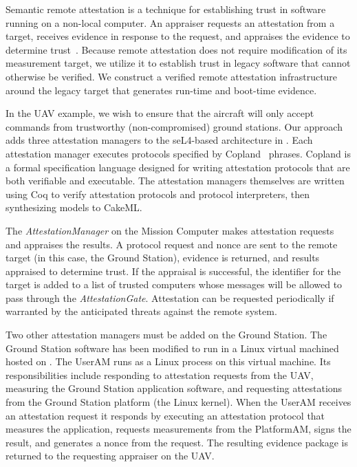 Semantic remote attestation is a technique for  establishing
trust in software running on a non-local computer.  
An appraiser requests an attestation from
a target, receives evidence in response to the request, and appraises
the evidence to determine
trust~\cite{Coker::Principles-of-R}. Because
remote attestation does not require modification of its measurement
target, we utilize it to establish trust in legacy software
that cannot otherwise be verified.  We construct a verified remote
attestation infrastructure around the legacy target that generates
run-time and boot-time evidence.

In the UAV example, we wish to ensure that the aircraft will only
accept commands from trustworthy (non-compromised) ground stations.
Our approach adds three attestation managers to the seL4-based
architecture in .  Each attestation manager
executes protocols specified by Copland~\cite{Ramsdell:2019aa}
phrases.  Copland is a formal specification language designed for
writing attestation protocols that are both verifiable and executable.
The attestation managers themselves are written using Coq to verify
attestation protocols and protocol interpreters, then synthesizing
models to CakeML.

The \emph{AttestationManager} on the Mission Computer makes
attestation requests and appraises the results.  A protocol request and nonce are
sent to the remote target (in this case, the Ground Station), 
evidence is returned, and results appraised to
determine trust.  If the appraisal is successful, the identifier for the 
target is added to a list of trusted computers whose messages 
will be allowed to pass through the \emph{AttestationGate}.  
Attestation can be requested periodically if warranted by the anticipated
threats against the remote system.  

Two other attestation managers must be added on the Ground Station.  
The Ground Station software has been modified to run in a Linux virtual 
machined hosted on \selFour.  
The UserAM runs as a Linux process on this virtual machine.  Its
responsibilities include responding to attestation requests from the UAV, 
measuring the Ground Station application software, and requesting
attestations from the Ground Station platform (the Linux kernel).  When the UserAM receives an
attestation request it responds by executing an attestation protocol
that measures the application, requests measurements from the
PlatformAM, signs the result, and generates a nonce from the request.  The
resulting evidence package is returned to the requesting appraiser on the UAV.

